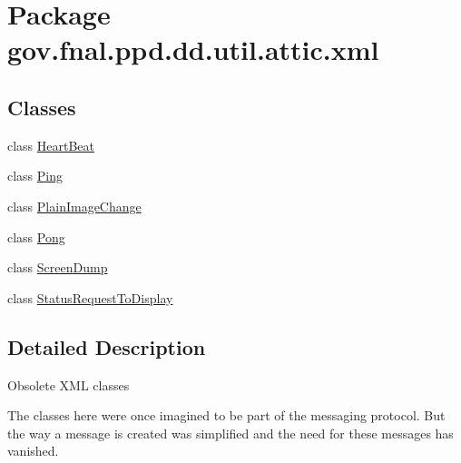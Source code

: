 \hypertarget{namespacegov_1_1fnal_1_1ppd_1_1dd_1_1util_1_1attic_1_1xml}{\section{Package gov.\-fnal.\-ppd.\-dd.\-util.\-attic.\-xml}
\label{namespacegov_1_1fnal_1_1ppd_1_1dd_1_1util_1_1attic_1_1xml}
}
\subsection*{Classes}
\begin{DoxyCompactItemize}
\item 
class \hyperlink{classgov_1_1fnal_1_1ppd_1_1dd_1_1util_1_1attic_1_1xml_1_1HeartBeat}{Heart\-Beat}
\item 
class \hyperlink{classgov_1_1fnal_1_1ppd_1_1dd_1_1util_1_1attic_1_1xml_1_1Ping}{Ping}
\item 
class \hyperlink{classgov_1_1fnal_1_1ppd_1_1dd_1_1util_1_1attic_1_1xml_1_1PlainImageChange}{Plain\-Image\-Change}
\item 
class \hyperlink{classgov_1_1fnal_1_1ppd_1_1dd_1_1util_1_1attic_1_1xml_1_1Pong}{Pong}
\item 
class \hyperlink{classgov_1_1fnal_1_1ppd_1_1dd_1_1util_1_1attic_1_1xml_1_1ScreenDump}{Screen\-Dump}
\item 
class \hyperlink{classgov_1_1fnal_1_1ppd_1_1dd_1_1util_1_1attic_1_1xml_1_1StatusRequestToDisplay}{Status\-Request\-To\-Display}
\end{DoxyCompactItemize}


\subsection{Detailed Description}
Obsolete X\-M\-L classes

The classes here were once imagined to be part of the messaging protocol. But the way a message is created was simplified and the need for these messages has vanished.